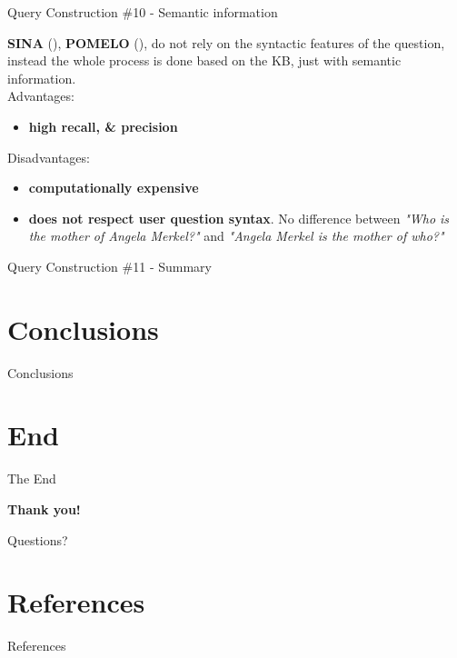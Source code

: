 \documentclass{beamer}
\begin{document}
\begin{frame}{Query Construction \#10 - Semantic information}
  \begin{card}
    \textbf{SINA} (\cite{shekarpour2015a}), \textbf{POMELO} (\cite{hamon2014a}), \cite{zhang2016a} do not rely on the syntactic features of the question, instead the whole process is done based on the KB, just with semantic information. \\
    Advantages:
    \begin{itemize}
      \item \textbf{high recall, \& precision}
    \end{itemize}
    Disadvantages:
    \begin{itemize}
      \item \textbf{computationally expensive}
      \item \textbf{does not respect user question syntax}. No difference between \textit{"Who is the mother of Angela Merkel?"} and \textit{"Angela Merkel is the mother of who?"}
    \end{itemize}
  \end{card}
\end{frame}

\begin{frame}{Query Construction \#11 - Summary}
  \begin{card}
  \end{card}
\end{frame}

\section{Conclusions}

\begin{frame}{Conclusions}
\end{frame}

\section{End}

\begin{frame}{The End}
  \begin{card}
    \centering
    \textbf{Thank you!}
  \end{card}
  \begin{card}
    \centering
    Questions?
  \end{card}
\end{frame}

\section{References}

\begin{frame}[allowframebreaks]{References}
    \printbibliography
\end{frame}
\end{document}
